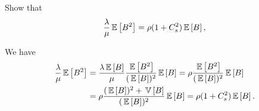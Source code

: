 \begin{question}\label{q:batch}
Show that 
\begin{equation*}
  \frac{\lambda}\mu \E{B^2} = \rho (1+C_s^2)\E B, 
\end{equation*}
  \begin{solution}
We have
\begin{equation*}
  \begin{split}
  \frac{\lambda}\mu \E{B^2} 
&=   \frac{\lambda\E B}{\mu} \frac{\E{B^2}}{(\E B)^2} \E B  = \rho \frac{\E{B^2}}{(\E B)^2} \E B \\
&= \rho \frac{(\E B)^2+\V B}{(\E B)^2}\E B = \rho (1+C_s^2)\E B.
  \end{split}
\end{equation*}
  \end{solution}
\end{question}

